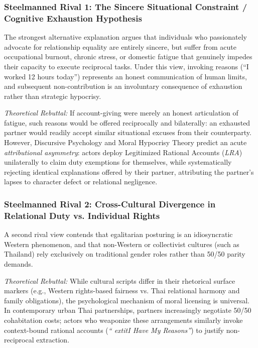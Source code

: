 \subsubsection{Steelmanned Rival 1: The Sincere Situational Constraint / Cognitive Exhaustion Hypothesis}
The strongest alternative explanation argues that individuals who passionately advocate for relationship equality are entirely sincere, but suffer from acute occupational burnout, chronic stress, or domestic fatigue that genuinely impedes their capacity to execute reciprocal tasks. Under this view, invoking reasons (``I worked 12 hours today'') represents an honest communication of human limits, and subsequent non-contribution is an involuntary consequence of exhaustion rather than strategic hypocrisy.

\textit{Theoretical Rebuttal:} If account-giving were merely an honest articulation of fatigue, such reasons would be offered reciprocally and bilaterally: an exhausted partner would readily accept similar situational excuses from their counterparty. However, Discursive Psychology and Moral Hypocrisy Theory predict an acute \textit{attributional asymmetry}: actors deploy Legitimized Rational Accounts (\textit{LRA}) unilaterally to claim duty exemptions for themselves, while systematically rejecting identical explanations offered by their partner, attributing the partner's lapses to character defect or relational negligence.

\subsubsection{Steelmanned Rival 2: Cross-Cultural Divergence in Relational Duty vs. Individual Rights}
A second rival view contends that egalitarian posturing is an idiosyncratic Western phenomenon, and that non-Western or collectivist cultures (such as Thailand) rely exclusively on traditional gender roles rather than 50/50 parity demands.

\textit{Theoretical Rebuttal:} While cultural scripts differ in their rhetorical surface markers (e.g., Western rights-based fairness vs. Thai relational harmony and family obligations), the psychological mechanism of moral licensing is universal. In contemporary urban Thai partnerships, partners increasingly negotiate 50/50 cohabitation costs; actors who weaponize these arrangements similarly invoke context-bound rational accounts (\textit{``	extit{I Have My Reasons''}}) to justify non-reciprocal extraction.

